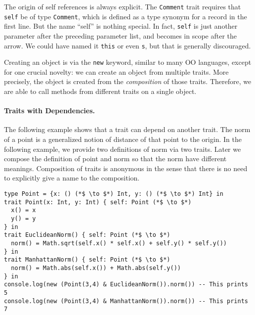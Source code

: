 The origin of self references is always explicit. The \lstinline$Comment$ trait
requires that \lstinline$self$ be of type \lstinline$Comment$, which is defined
as a type synonym for a record in the first line. But the name ``self'' is
nothing special. In fact, \lstinline$self$ is just another parameter after the
preceding parameter list, and becomes in scope after the arrow. We could have
named it \lstinline$this$ or even \lstinline$s$, but that is generally
discouraged.

Creating an object is via the \lstinline$new$ keyword, similar to many OO
languages, except for one crucial novelty: we can create an object from multiple
traits. More precisely, the object is created from the \emph{composition} of
those traits. Therefore, we are able to call methods from different traits on a
single object.

\paragraph{Traits with Dependencies.} The following example shows that a trait
can depend on another trait. The norm of a point is a generalized notion of
distance of that point to the origin. In the following example, we provide two
definitions of norm via two traits. Later we compose the definition of point and
norm so that the norm have different meanings. Composition of traits is
anonymous in the sense that there is no need to explicitly give a name to the
composition.

\begin{lstlisting}
type Point = {x: () (*$ \to $*) Int, y: () (*$ \to $*) Int} in
trait Point(x: Int, y: Int) { self: Point (*$ \to $*)
  x() = x
  y() = y
} in
trait EuclideanNorm() { self: Point (*$ \to $*)
  norm() = Math.sqrt(self.x() * self.x() + self.y() * self.y())
} in
trait ManhattanNorm() { self: Point (*$ \to $*)
  norm() = Math.abs(self.x()) + Math.abs(self.y())
} in
console.log(new (Point(3,4) & EuclideanNorm()).norm()) -- This prints 5
console.log(new (Point(3,4) & ManhattanNorm()).norm()) -- This prints 7
\end{lstlisting}

